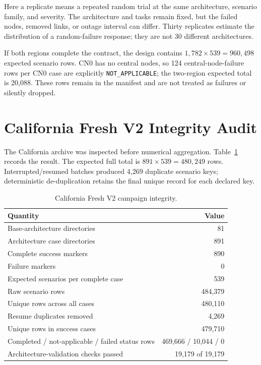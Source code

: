 Here a replicate means a repeated random trial at the same architecture, scenario family, and severity. The architecture and tasks remain fixed, but the failed nodes, removed links, or outage interval can differ. Thirty replicates estimate the distribution of a random-failure response; they are not 30 different architectures.

If both regions complete the contract, the design contains $1{,}782\times539=960{,}498$ expected scenario rows. CN0 has no central nodes, so 124 central-node-failure rows per CN0 case are explicitly \texttt{NOT\_APPLICABLE}; the two-region expected total is 20,088. These rows remain in the manifest and are not treated as failures or silently dropped.

\section{California Fresh V2 Integrity Audit}

The California archive was inspected before numerical aggregation. Table~\ref{tab:ca_integrity} records the result. The expected full total is $891\times539=480{,}249$ rows. Interrupted/resumed batches produced 4,269 duplicate scenario keys; deterministic de-duplication retains the final unique record for each declared key.

\begin{table}[htbp]
\centering
\caption{California Fresh V2 campaign integrity.}
\label{tab:ca_integrity}
\begin{tabular}{lr}
\toprule
Quantity & Value \\
\midrule
Base-architecture directories & 81 \\
Architecture case directories & 891 \\
Complete success markers & 890 \\
Failure markers & 0 \\
Expected scenarios per complete case & 539 \\
Raw scenario rows & 484,379 \\
Unique rows across all cases & 480,110 \\
Resume duplicates removed & 4,269 \\
Unique rows in success cases & 479,710 \\
Completed / not-applicable / failed status rows & 469,666 / 10,044 / 0 \\
Architecture-validation checks passed & 19,179 of 19,179 \\
\bottomrule
\end{tabular}
\end{table}

